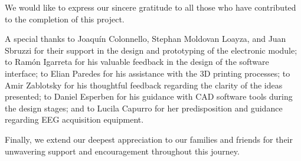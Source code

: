 \documentclass[../00_Main.tex]{subfiles}
\begin{document}
We would like to express our sincere gratitude to all those who have contributed to the completion of this project. 

A special thanks to Joaquín Colonnello, Stephan Moldovan Loayza, and Juan Sbruzzi for their support in the design and prototyping of the electronic module; to Ramón Igarreta for his valuable feedback in the design of the software interface; to Elian Paredes for his assistance with the 3D printing processes; to Amir Zablotsky for his thoughtful feedback regarding the clarity of the ideas presented; to Daniel Esperben for his guidance with CAD software tools during the design stages; and to Lucila Capurro for her predisposition and guidance regarding EEG acquisition equipment.

Finally, we extend our deepest appreciation to our families and friends for their unwavering support and encouragement throughout this journey.

\biblio %
\end{document}
